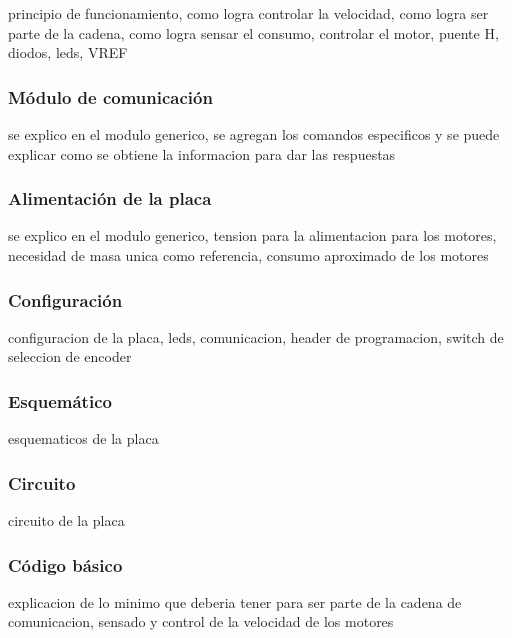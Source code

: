 principio de funcionamiento, como logra controlar la velocidad, como logra ser parte de la cadena, como logra sensar el consumo, controlar el motor, puente H, diodos, leds, VREF

\subsubsection{M\'odulo de comunicaci\'on}
\label{h_placas_motorDC_comm}

se explico en el modulo generico, se agregan los comandos especificos y se puede explicar como se obtiene la informacion para dar las respuestas

\subsubsection{Alimentaci\'on de la placa}
\label{h_placas_motorDC_alimentacion}

se explico en el modulo generico, tension para la alimentacion para los motores, necesidad de masa unica como referencia, consumo aproximado de los motores

\subsubsection{Configuraci\'on}
\label{h_placas_motorDC_config}

configuracion de la placa, leds, comunicacion, header de programacion, switch de seleccion de encoder

\subsubsection{Esquem\'atico}
\label{h_placas_motorDC_esquematico}

esquematicos de la placa

\subsubsection{Circuito}
\label{h_placas_motorDC_circuito}

circuito de la placa

\subsubsection{C\'odigo b\'asico}
\label{h_placas_motorDC_codigo}

explicacion de lo minimo que deberia tener para ser parte de la cadena de comunicacion, sensado y control de la velocidad de los motores

